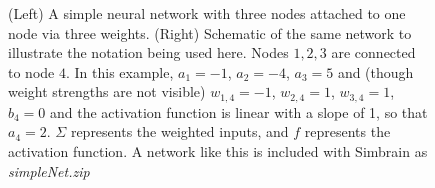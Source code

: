 \begin{figure}[h]
\centering
{}
\hspace*{.4in}
\caption[Left: Simbrain screenshot; Right: Jeff Yoshimi.]{(Left) A simple neural network with three nodes attached to one node via three weights. (Right) Schematic of the same network to illustrate the notation being used here. Nodes $1,2, 3$ are connected to node $4$. In this example, $a_1 = -1$, $a_2 = -4$, $a_3=5$ and (though weight strengths are not visible) $w_{1,4} = -1$, $w_{2,4} = 1$, $w_{3,4} = 1$, $b_4 = 0$ and the activation function is linear with a slope of 1, so that $a_4 = 2$. $\Sigma$ represents the weighted inputs, and $f$ represents the activation function. A network like this is included with Simbrain as \emph{simpleNet.zip}}
\label{F:simplenet1}
\end{figure}

